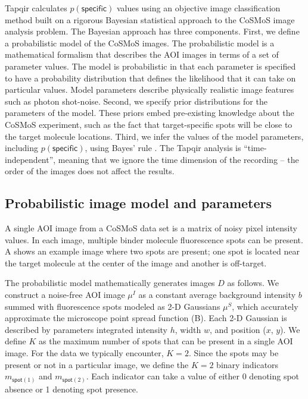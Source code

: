 Tapqir calculates $p(\mathsf{specific})$ values using an objective image classification method built on a rigorous Bayesian statistical approach to the CoSMoS image analysis problem. The Bayesian approach has three components. First, we define a probabilistic model of the CoSMoS images. The probabilistic model is a mathematical formalism that describes the AOI images in terms of a set of parameter values.  The model is probabilistic in that each parameter is specified to have a probability distribution that defines the likelihood that it can take on particular values. Model parameters describe physically realistic image features such as photon shot-noise. Second, we specify prior distributions for the parameters of the model. These priors embed pre-existing knowledge about the CoSMoS experiment, such as the fact that target-specific spots will be close to the target molecule locations. Third, we infer the values of the model parameters, including $p(\mathsf{specific})$, using Bayes' rule \citep{Bishop2006-oa}. The Tapqir analysis is “time-independent”, meaning that we ignore the time dimension of the recording -- the order of the images does not affect the results. 

\subsection{Probabilistic image model and parameters} %

A single AOI image from a CoSMoS data set is a matrix of noisy pixel intensity values.  In each image, multiple binder molecule fluorescence spots can be present. A shows an example image where two spots are present; one spot is located near the target molecule at the center of the image and another is off-target.

The probabilistic model mathematically generates images $D$ as follows.  We construct a noise-free AOI image $\mu^I$ as a constant average background intensity $b$ summed with fluorescence spots modeled as 2-D Gaussians $\mu^S$, which accurately approximate the microscope point spread function \citep{Zhang2007-rb} (B). Each 2-D Gaussian is described by parameters integrated intensity $h$, width $w$, and position ($x$, $y$). We define $K$ as the maximum number of spots that can be present in a single AOI image.  For the data we typically encounter, $K = 2$. Since the spots may be present or not in a particular image, we define the $K = 2$ binary indicators $m_{\mathsf{spot}(1)}$ and $m_{\mathsf{spot}(2)}$.  Each indicator can take a value of either 0 denoting spot absence or 1 denoting spot presence. 

